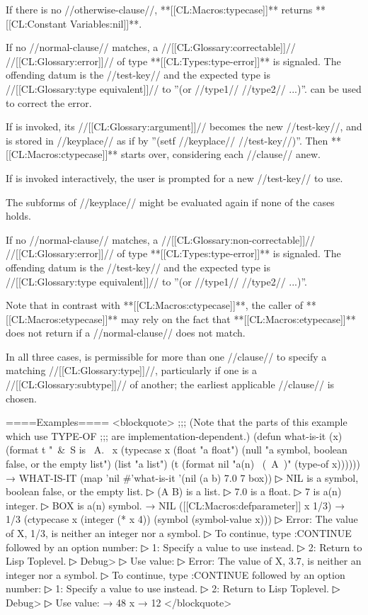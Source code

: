 If there is no //otherwise-clause//, **[[CL:Macros:typecase]]** returns **[[CL:Constant Variables:nil]]**.


If no //normal-clause// matches, a //[[CL:Glossary:correctable]]// //[[CL:Glossary:error]]// of type **[[CL:Types:type-error]]** is signaled. The offending datum is the //test-key// and the expected type is //[[CL:Glossary:type equivalent]]// to ''(or //type1// //type2// ...)''.  can be used to correct the error.

If  is invoked, its //[[CL:Glossary:argument]]// becomes the new //test-key//, and is stored in //keyplace// as if by ''(setf //keyplace// //test-key//)''. Then **[[CL:Macros:ctypecase]]** starts over, considering each //clause// anew.

If  is invoked interactively, the user is prompted for a new //test-key// to use.

The subforms of //keyplace// might be evaluated again if none of the cases holds.


If no //normal-clause// matches, a //[[CL:Glossary:non-correctable]]// //[[CL:Glossary:error]]// of type **[[CL:Types:type-error]]** is signaled. The offending datum is the //test-key// and the expected type is //[[CL:Glossary:type equivalent]]// to ''(or //type1// //type2// ...)''.

Note that in contrast with **[[CL:Macros:ctypecase]]**, the caller of **[[CL:Macros:etypecase]]** may rely on the fact that **[[CL:Macros:etypecase]]** does not return if a //normal-clause// does not match.

\endlist

In all three cases, is permissible for more than one //clause// to specify a matching //[[CL:Glossary:type]]//, particularly if one is a //[[CL:Glossary:subtype]]// of another; the earliest applicable //clause// is chosen.

====Examples====
<blockquote> ;;; (Note that the parts of this example which use TYPE-OF ;;; are implementation-dependent.) (defun what-is-it (x) (format t "~&~S is ~A.~ x (typecase x (float "a float") (null "a symbol, boolean false, or the empty list") (list "a list") (t (format nil "a(n) ~(~A~)" (type-of x)))))) → WHAT-IS-IT (map 'nil #'what-is-it '(nil (a b) 7.0 7 box))
▷ NIL is a symbol, boolean false, or the empty list.
▷ (A B) is a list.
▷ 7.0 is a float.
▷ 7 is a(n) integer.
▷ BOX is a(n) symbol. → NIL ([[CL:Macros:defparameter]] x 1/3) → 1/3 (ctypecase x (integer (* x 4)) (symbol (symbol-value x)))
▷ Error: The value of X, 1/3, is neither an integer nor a symbol.
▷ To continue, type :CONTINUE followed by an option number:
▷ 1: Specify a value to use instead.
▷ 2: Return to Lisp Toplevel.
▷ Debug> 
▷ Use value: 
▷ Error: The value of X, 3.7, is neither an integer nor a symbol.
▷ To continue, type :CONTINUE followed by an option number:
▷ 1: Specify a value to use instead.
▷ 2: Return to Lisp Toplevel.
▷ Debug> 
▷ Use value:  → 48 x → 12 </blockquote>

